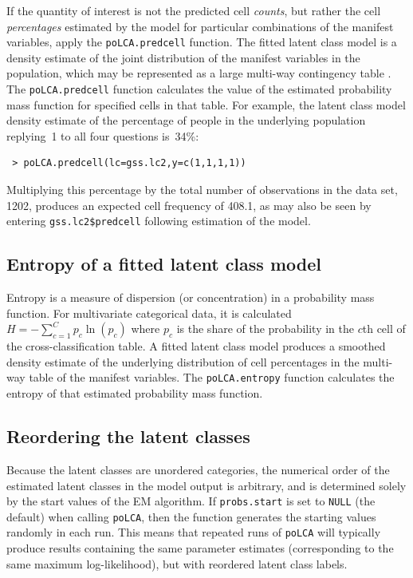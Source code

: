 \documentclass[letterpaper,12pt]{article}
\begin{document}
If the quantity of interest is not the predicted cell \emph{counts}, but rather the cell \emph{percentages} estimated by the model for particular combinations of the manifest variables, apply the \texttt{poLCA.predcell} function.  The fitted latent class model is a density estimate of the joint distribution of the manifest variables in the population, which may be represented as a large multi-way contingency table \citep[see, e.g.,][]{Linzer2011}.  The \texttt{poLCA.predcell} function calculates the value of the estimated probability mass function for specified cells in that table. For example, the latent class model density estimate of the percentage of people in the underlying population replying~1 to all four questions is~34\%:
\begin{verbatim}
 > poLCA.predcell(lc=gss.lc2,y=c(1,1,1,1))
\end{verbatim}
Multiplying this percentage by the total number of observations in the data set, 1202, produces an expected cell frequency of 408.1, as may also be seen by entering \texttt{gss.lc2\$predcell} following estimation of the model.

\subsection{Entropy of a fitted latent class model} \label{s.entropy}

Entropy is a measure of dispersion (or concentration) in a probability mass function. For multivariate categorical data, it is calculated $H = -\sum_{c=1}^C p_c \ln(p_c)$ where $p_c$ is the share of the probability in the $c$th cell of the cross-classification table.  A fitted latent class model produces a smoothed density estimate of the underlying distribution of cell percentages in the multi-way table of the manifest variables.  The \texttt{poLCA.entropy} function calculates the entropy of that estimated probability mass function.

\subsection{Reordering the latent classes}

Because the latent classes are unordered categories, the numerical order of the estimated latent classes in the model output is arbitrary, and is determined solely by the start values of the EM algorithm. If \texttt{probs.start} is set to \texttt{NULL} (the default) when calling \texttt{poLCA}, then the function generates the starting values randomly in each run. This means that repeated runs of \texttt{poLCA} will typically produce results containing the same parameter estimates (corresponding to the same maximum log-likelihood), but with reordered latent class labels.
\end{document}

